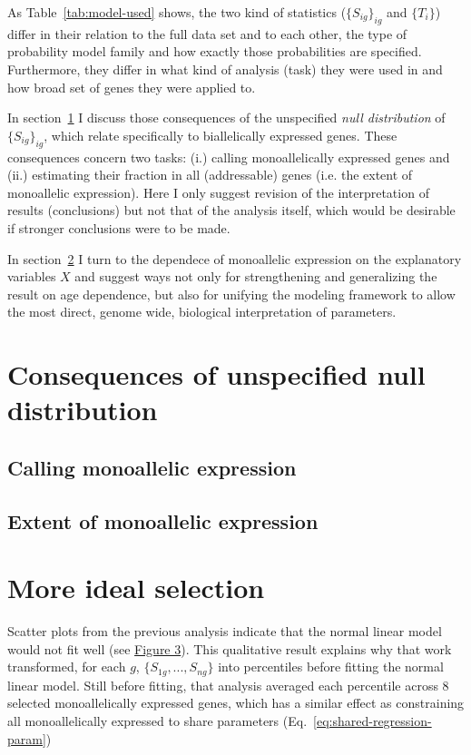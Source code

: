 \documentclass[letterpaper]{article}
\begin{document}
As Table~\ref{tab:model-used} shows, the two kind of statistics
(\(\{S_{ig}\}_{ig}\) and \(\{T_i\}\)) differ in their relation to the full
data set and to each other, the type of probability model family and how
exactly those probabilities are specified.  Furthermore, they differ in what
kind of analysis (task) they were used in and how broad set of genes they were
applied to.

In section~\ref{sec:consequences} I discuss those consequences of the
unspecified \emph{null distribution} of \(\{S_{ig}\}_{ig}\), which relate
specifically to biallelically expressed genes.  These consequences concern two
tasks: (i.) calling monoallelically expressed genes and (ii.) estimating their fraction
in all (addressable) genes (i.e. the extent of monoallelic expression).  Here
I only suggest revision of the interpretation of results (conclusions) but not that of the
analysis itself, which would be desirable if stronger conclusions were to be
made.

In section~\ref{sec:full-specification} I turn to the dependece of monoallelic
expression on the explanatory variables \(X\) and suggest ways not only for
strengthening and generalizing the result on age dependence, but also for
unifying the modeling framework to allow the most direct, genome wide,
biological interpretation of parameters.

\section{Consequences of unspecified null distribution}
\label{sec:consequences}

\subsection{Calling monoallelic expression}

\subsection{Extent of monoallelic expression}

\section{More ideal selection}
\label{sec:full-specification}

Scatter plots from the previous analysis indicate that the normal linear model
would not fit well (see
\href{https://docs.google.com/presentation/d/1YvpA1AJ-zzir1Iw0F25tO9x8gkSAzqaO4fjB7K3zBhE/edit?usp=sharing}{Figure
3}).
This qualitative result explains why that work transformed, for each \(g\),
\(\{S_{1g},...,S_{ng}\}\) into percentiles before fitting the normal linear model.  Still before fitting, that analysis averaged
each percentile across 8 selected monoallelically expressed genes, which has a similar effect as
constraining all monoallelically expressed to share parameters
(Eq.~\ref{eq:shared-regression-param})
\end{document}
